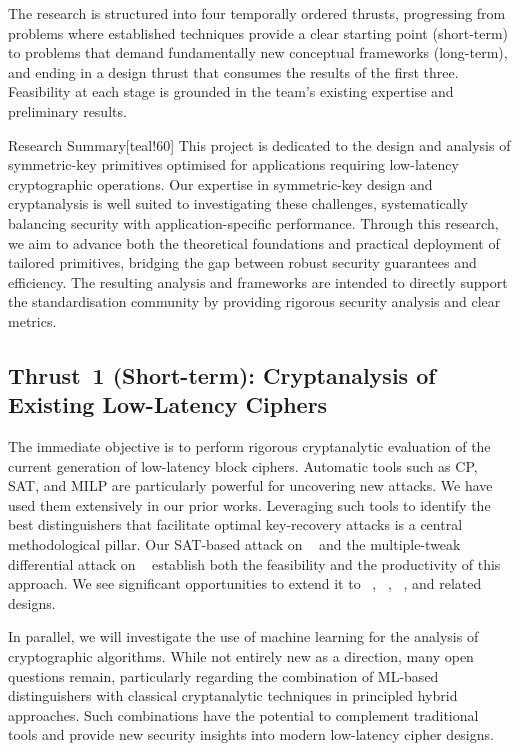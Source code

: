 The research is structured into four temporally ordered thrusts, progressing from problems where established techniques provide a clear starting point (short-term) to problems that demand fundamentally new conceptual frameworks (long-term), and ending in a design thrust that consumes the results of the first three.
Feasibility at each stage is grounded in the team's existing expertise and preliminary results.

\begin{genericbox}{Research Summary}[teal!60]
This project is dedicated to the design and analysis of symmetric-key primitives optimised for applications requiring low-latency cryptographic operations.
Our expertise in symmetric-key design and cryptanalysis is well suited to investigating these challenges, systematically balancing security with application-specific performance.
Through this research, we aim to advance both the theoretical foundations and practical deployment of tailored primitives, bridging the gap between robust security guarantees and efficiency.
The resulting analysis and frameworks are intended to directly support the standardisation community by providing rigorous security analysis and clear metrics.
\end{genericbox}

\subsection{Thrust~1 (Short-term): Cryptanalysis of Existing Low-Latency Ciphers}

The immediate objective is to perform rigorous cryptanalytic evaluation of the current generation of low-latency block ciphers.
Automatic tools such as CP, SAT, and MILP are particularly powerful for uncovering new attacks. We have used them extensively in our prior works.
Leveraging such tools to identify the best distinguishers that facilitate optimal key-recovery attacks is a central methodological pillar.
Our SAT-based attack on ~ and the multiple-tweak differential attack on ~ establish both the feasibility and the productivity of this approach. We see significant opportunities to extend it to ~\cite{cryptoeprint:2024/1240}, ~\cite{DBLP:conf/eurocrypt/BelkheyarDGLMPRSSAV25}, ~\cite{DBLP:conf/uss/CanaleGLTTU23}, and related designs.

In parallel, we will investigate the use of machine learning for the analysis of cryptographic algorithms.
While not entirely new as a direction, many open questions remain, particularly regarding the combination of ML-based distinguishers with classical cryptanalytic techniques in principled hybrid approaches.
Such combinations have the potential to complement traditional tools and provide new security insights into modern low-latency cipher designs.

